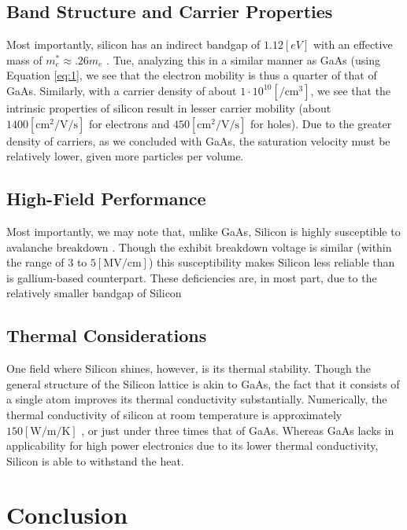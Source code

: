 \documentclass[conference]{IEEEtran}
\begin{document}
\subsection{Band Structure and Carrier Properties}

Most importantly, silicon has an indirect bandgap of $1.12[\si{eV}]$ with an effective mass of $m_e^*\approx .26m_e$ \cite[Page 424]{textbook}. Tue, analyzing this in a similar manner as GaAs (using Equation \ref{eq:1}, we see that the electron mobility is thus a quarter of that of GaAs. Similarly, with a carrier density of about $1\cdot10^{10}[\si{\per\centi\meter\cubed}]$, we see that the intrinsic properties of silicon result in lesser carrier mobility (about $1400[\si{\centi\meter\squared\per\volt\per\second}]$ for electrons and $450[\si{\centi\meter\squared\per\volt\per\second}]$ for holes). Due to the greater density of carriers, as we concluded with GaAs, the saturation velocity must be relatively lower, given more particles per volume.

\subsection{High-Field Performance}

Most importantly, we may note that, unlike GaAs, Silicon is highly susceptible to avalanche breakdown \cite[Page 562]{textbook}. Though the exhibit breakdown voltage is similar (within the range of $3$ to $5[\si{\mega\volt\per\centi\meter}]$) this susceptibility makes Silicon less reliable than is gallium-based counterpart. These deficiencies are, in most part, due to the relatively smaller bandgap of Silicon

\subsection{Thermal Considerations}

One field where Silicon shines, however, is its thermal stability. Though the general structure of the Silicon lattice is akin to GaAs, the fact that it consists of a single atom improves its thermal conductivity substantially. Numerically, the thermal conductivity of silicon at room temperature is approximately $150[\si{\watt\per\meter\per\kelvin}]$ \cite{STherm}, or just under three times that of GaAs. Whereas GaAs lacks in applicability for high power electronics due to its lower thermal conductivity, Silicon is able to withstand the heat.

\section{Conclusion}
\end{document}
